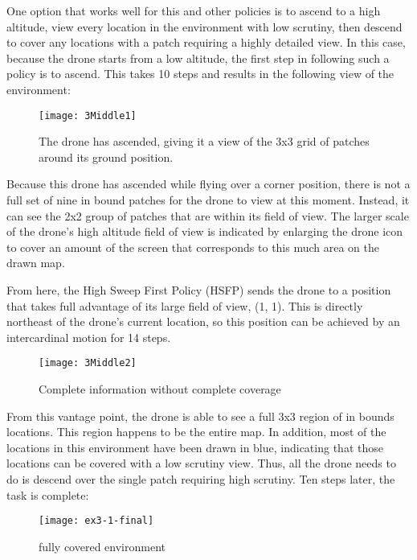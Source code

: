 One option that works well for this and other policies is to ascend to a high altitude, view every location in the environment with low scrutiny, then descend to cover any locations with a patch requiring a highly detailed view. In this case, because the drone starts from a low altitude, the first step in following such a policy is to ascend. This takes 10 steps and results in the following view of the environment:

\begin{figure}[H]
\texttt{[image: 3Middle1]}
\caption[Partially Explored Environment]{The drone has ascended, giving it a view of the 3x3 grid of patches around its ground position.}
\end{figure}

Because this drone has ascended while flying over a corner position, there is not a full set of nine in bound patches for the drone to view at this moment. Instead, it can see the 2x2 group of patches that are within its field of view. The larger scale of the drone's high altitude field of view is indicated by enlarging the drone icon to cover an amount of the screen that corresponds to this much area on the drawn map.

From here, the High Sweep First Policy (HSFP) sends the drone to a position that takes full advantage of its large field of view, (1, 1). This is directly northeast of the drone's current location, so this position can be achieved by an intercardinal motion for 14 steps.

\begin{figure}[H]
\texttt{[image: 3Middle2]}
\caption[Complete information without complete coverage]{Complete information without complete coverage}
\end{figure}

From this vantage point, the drone is able to see a full 3x3 region of in bounds locations. This region happens to be the entire map. In addition, most of the locations in this environment have been drawn in blue, indicating that those locations can be covered with a low scrutiny view. Thus, all the drone needs to do is descend over the single patch requiring high scrutiny. Ten steps later, the task is complete:

\begin{figure}[H]
\texttt{[image: ex3-1-final]}
\caption[Fully Covered Environment]{fully covered environment}
\label{fig:3-1-end}
\end{figure}

